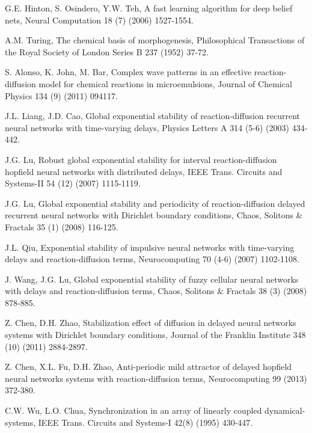 \documentclass[review]{elsarticle}
\begin{document}
\begin{thebibliography}{99}
G.E. Hinton, S. Osindero, Y.W. Teh, A fast learning algorithm for deep belief nets, Neural Computation 18 (7) (2006) 1527-1554.

A.M. Turing, The chemical basis of morphogenesis, Philosophical Transactions of the Royal Society of London Series B 237 (1952) 37-72.

S. Alonso, K. John, M. Bar, Complex wave patterns in an effective reaction-diffusion model for chemical reactions in microemulsions, Journal of Chemical Physics 134 (9) (2011) 094117.

J.L. Liang, J.D. Cao, Global exponential stability of reaction-diffusion recurrent neural networks with time-varying delays, Physics Letters A 314 (5-6) (2003) 434-442.

J.G. Lu, Robust global exponential stability for interval reaction-diffusion hopfield neural networks with distributed delays, IEEE Trans. Circuits and Systems-II 54 (12) (2007) 1115-1119.

J.G. Lu, Global exponential stability and periodicity of reaction-diffusion delayed recurrent neural networks with Dirichlet boundary conditions, Chaos, Solitons $\&$ Fractals 35 (1) (2008) 116-125.

J.L. Qiu, Exponential stability of impulsive neural networks with time-varying delays and reaction-diffusion terms, Neurocomputing 70 (4-6) (2007) 1102-1108.

J. Wang, J.G. Lu, Global exponential stability of fuzzy cellular neural networks with delays and reaction-diffusion terms, Chaos, Solitons $\&$ Fractals 38 (3) (2008) 878-885.

Z. Chen, D.H. Zhao, Stabilization effect of diffusion in delayed neural networks systems with Dirichlet boundary conditions, Journal of the Franklin Institute 348 (10) (2011) 2884-2897.

Z. Chen, X.L. Fu, D.H. Zhao, Anti-periodic mild attractor of delayed hopfield neural networks systems with reaction-diffusion terms, Neurocomputing 99 (2013) 372-380.





C.W. Wu, L.O. Chua, Synchronization in an array of linearly coupled dynamical-systems, IEEE Trans. Circuits and Systems-I 42(8) (1995) 430-447.


\end{thebibliography}
\end{document}
